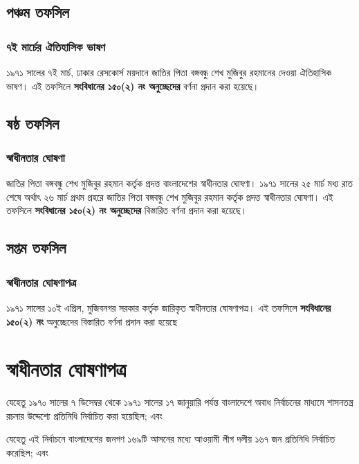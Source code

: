 \documentclass[11pt]{article}
\begin{document}
\subsection{পঞ্চম তফসিল}
\label{sec:org59617eb}
\subsubsection{৭ই মার্চের ঐতিহাসিক ভাষণ}
\label{sec:orgfc85bf5}
১৯৭১ সালের ৭ই মার্চ, ঢাকার রেসকোর্স ময়দানে
জাতির পিতা বঙ্গবন্ধু শেখ মুজিবুর রহমানের দেওয়া ঐতিহাসিক ভাষণ। এই তফসিলে
\textbf{সংবিধানের ১৫০(২) নং অনুচ্ছেদের} বর্ণনা প্রদান করা হয়েছে।

\subsection{ষষ্ঠ তফসিল}
\label{sec:orga2579e7}
\subsubsection{স্বাধীনতার ঘোষণা}
\label{sec:org450b7b3}
জাতির পিতা বঙ্গবন্ধু শেখ মুজিবুর রহমান কর্তৃক প্রদত্ত
বাংলাদেশের স্বাধীনতার ঘোষণা। ১৯৭১ সালের ২৫ মার্চ মধ্য রাত শেষে অর্থাৎ ২৬
মার্চ প্রথম প্রহরে জাতির পিতা বঙ্গবন্ধু শেখ মুজিবুর রহমান কর্তৃক প্রদত্ত স্বাধীনতার
ঘােষণা। এই তফসিলে \textbf{সংবিধানের ১৫০(২) নং অনুচ্ছেদের} বিস্তারিত বর্ণনা প্রদান
করা হয়েছে।

\subsection{সপ্তম তফসিল}
\label{sec:orge24ad9c}
\subsubsection{স্বাধীনতার ঘোষণাপত্র}
\label{sec:orgc3b36c1}
১৯৭১ সালের ১০ই এপ্রিল, মুজিবনগর সরকার কর্তৃক জারিকৃত
স্বাধীনতার ঘোষণাপত্র। এই তফসিলে \textbf{সংবিধানের ১৫০(২) নং} অনুচ্ছেদের বিস্তারিত
বর্ণনা প্রদান করা হয়েছে

\section{স্বাধীনতার ঘোষণাপত্র}
\label{sec:org7254ed6}
যেহেতু ১৯৭০ সালের ৭ ডিসেম্বর থেকে ১৯৭১ সালের ১৭ জানুয়ারি পর্যন্ত বাংলাদেশে
অবাধ নির্বাচনের মাধ্যমে শাসনতন্ত্র রচনার উদ্দেশ্যে প্রতিনিধি নির্বাচিত করা
হয়েছিল; এবং

যেহেতু এই নির্বাচনে বাংলাদেশের জনগণ ১৬৯টি আসনের মধ্যে আওয়ামী লীগ দলীয় ১৬৭
জন প্রতিনিধি নির্বাচিত করেছিল; এবং
\end{document}
